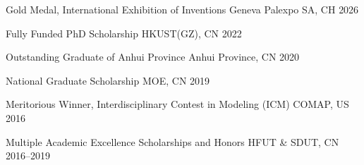 



\begin{cvhonors}

\cvhonor
  {Gold Medal, International Exhibition of Inventions Geneva}
  {}
  {Palexpo SA, CH}
  {2026}

\cvhonor
  {Fully Funded PhD Scholarship}
  {}
  {HKUST(GZ), CN}
  {2022}

\cvhonor
  {Outstanding Graduate of Anhui Province}
  {}
  {Anhui Province, CN}
  {2020}

\cvhonor
  {National Graduate Scholarship}
  {}
  {MOE, CN}
  {2019}

\cvhonor
  {Meritorious Winner, Interdisciplinary Contest in Modeling (ICM)}
  {}
  {COMAP, US}
  {2016}

\cvhonor
  {Multiple Academic Excellence Scholarships and Honors}
  {}
  {HFUT \& SDUT, CN}
  {2016--2019}

\end{cvhonors}